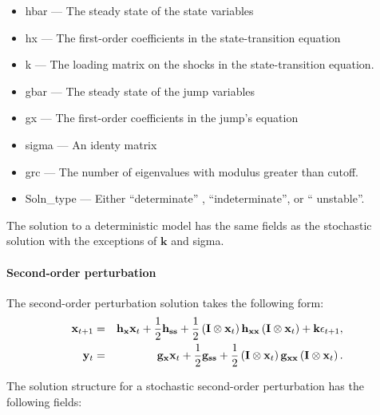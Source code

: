 \documentclass[notitlepage,11pt]{article}
\begin{document}
\begin{itemize}
\item hbar --- The steady state of the state variables

\item hx --- The first-order coefficients in the state-transition equation

\item k --- The loading matrix on the shocks in the state-transition
equation.

\item gbar --- The steady state of the jump variables

\item gx --- The first-order coefficients in the jump's equation

\item sigma --- An identy matrix

\item grc --- The number of eigenvalues with modulus greater than cutoff.

\item Soln\_type --- Either \textquotedblleft determinate\textquotedblright
, \textquotedblleft indeterminate\textquotedblright , or \textquotedblleft
unstable\textquotedblright .
\end{itemize}

The solution to a deterministic model has the same fields as the stochastic
solution with the exceptions of $\mathbf{k}$ and sigma.

\paragraph{Second-order perturbation}

The second-order perturbation solution takes the following form:%
\begin{eqnarray*}
\mathbf{x}_{t+1} &=&\mathbf{h}_{\mathbf{x}}\mathbf{x}_{t}+\frac{1}{2}\mathbf{%
h}_{\mathbf{ss}}+\frac{1}{2}\left( \mathbf{I}\otimes \mathbf{x}_{t}\right) 
\mathbf{h}_{\mathbf{xx}}\left( \mathbf{I}\otimes \mathbf{x}_{t}\right) +%
\mathbf{k\epsilon }_{t+1}, \\
\mathbf{y}_{t} &=&\mathbf{g}_{\mathbf{x}}\mathbf{x}_{t}+\frac{1}{2}\mathbf{g}%
_{\mathbf{ss}}+\frac{1}{2}\left( \mathbf{I}\otimes \mathbf{x}_{t}\right) 
\mathbf{g}_{\mathbf{xx}}\left( \mathbf{I}\otimes \mathbf{x}_{t}\right) .
\end{eqnarray*}

The solution structure for a stochastic second-order perturbation has the
following fields:
\end{document}
